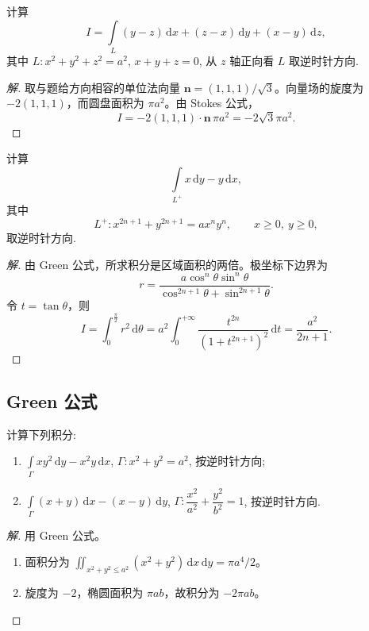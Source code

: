 \documentclass[../../数学分析培优讲义(答案版).tex]{subfiles}
\begin{document}
\begin{example}
计算
\[
    I=\int\limits_L(y-z)\,\mathrm{d}x+(z-x)\,\mathrm{d}y+(x-y)\,\mathrm{d}z,
\]
其中 $L:x^2+y^2+z^2=a^2$, $x+y+z=0$, 从 $z$ 轴正向看 $L$ 取逆时针方向.
\end{example}

\begin{proof}[解]
取与题给方向相容的单位法向量 $\bm n=(1,1,1)/\sqrt{3}$。向量场的旋度为 $-2(1,1,1)$，而圆盘面积为 $\pi a^2$。由 Stokes 公式，
\[
I=-2(1,1,1)\cdot\bm n\,\pi a^2=-2\sqrt{3}\pi a^2.
\]
\end{proof}

\begin{example}
计算
\[
    \int\limits_{L^+}x\,\mathrm{d}y-y\,\mathrm{d}x,
\]
其中
\[
    L^+:x^{2n+1}+y^{2n+1}=ax^ny^n,\qquad x\geq0,\ y\geq0,
\]
取逆时针方向.
\end{example}

\begin{proof}[解]
由 Green 公式，所求积分是区域面积的两倍。极坐标下边界为
\[
r=\dfrac{a\cos^n\theta\sin^n\theta}{\cos^{2n+1}\theta+\sin^{2n+1}\theta}.
\]
令 $t=\tan\theta$，则
\[
I=\int_0^{\frac{\pi}{2}}r^2\,\mathrm{d}\theta
=a^2\int_0^{+\infty}\dfrac{t^{2n}}{(1+t^{2n+1})^2}\,\mathrm{d}t
=\dfrac{a^2}{2n+1}.
\]
\end{proof}

\subsection{Green 公式}

\begin{example}
计算下列积分:
\begin{enumerate}[label=(\arabic*)]
    \item $\displaystyle\int\limits_\Gamma xy^2\,\mathrm{d}y-x^2y\,\mathrm{d}x$, $\Gamma:x^2+y^2=a^2$, 按逆时针方向;
    \item $\displaystyle\int\limits_\Gamma(x+y)\,\mathrm{d}x-(x-y)\,\mathrm{d}y$, $\Gamma:\dfrac{x^2}{a^2}+\dfrac{y^2}{b^2}=1$, 按逆时针方向.
\end{enumerate}
\end{example}

\begin{proof}[解]
用 Green 公式。
\begin{enumerate}[label=(\arabic*)]
\item 面积分为 $\iint_{x^2+y^2\leq a^2}(x^2+y^2)\,\mathrm{d}x\,\mathrm{d}y=\pi a^4/2$。
\item 旋度为 $-2$，椭圆面积为 $\pi ab$，故积分为 $-2\pi ab$。
\end{enumerate}
\end{proof}
\end{document}

